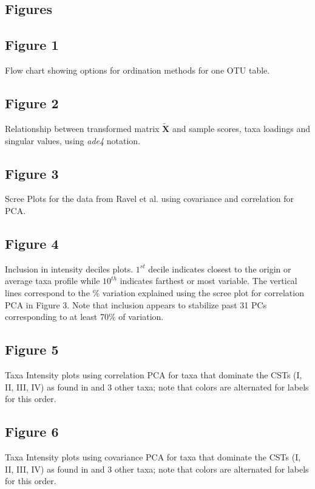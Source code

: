 \documentclass[doublespacing]{bmcart}
\def\X{\mathbf{X}}
\begin{document}
\begin{backmatter}


\section*{Figures}



\subsection* {Figure 1} Flow chart showing options for ordination methods for one OTU table.

\subsection* {Figure 2} Relationship between transformed matrix $\tilde{\X}$ and sample scores, taxa loadings and singular values, using \textit{ade4} notation. 

\subsection* {Figure 3} Scree Plots for the data from Ravel et al. \cite{Ravel} using covariance and correlation for PCA.

\subsection* {Figure 4} Inclusion in intensity deciles plots. $1^{st}$ decile indicates closest to the origin or average taxa profile while $10^{th}$ indicates farthest or most variable. The vertical lines correspond to the \% variation explained using the scree plot for correlation PCA in Figure 3. Note that inclusion appears to stabilize past 31 PCs corresponding to at least 70\% of variation.

\subsection* {Figure 5} Taxa Intensity plots using correlation PCA for taxa that dominate the CSTs (I, II, III, IV) as found in \cite{Ravel} and 3 other taxa; note that colors are alternated for labels for this order.

\subsection* {Figure 6} Taxa Intensity plots using covariance PCA for taxa that dominate the CSTs (I, II, III, IV) as found in \cite{Ravel} and 3 other taxa; note that colors are alternated for labels for this order.


\end{backmatter}
\end{document}
